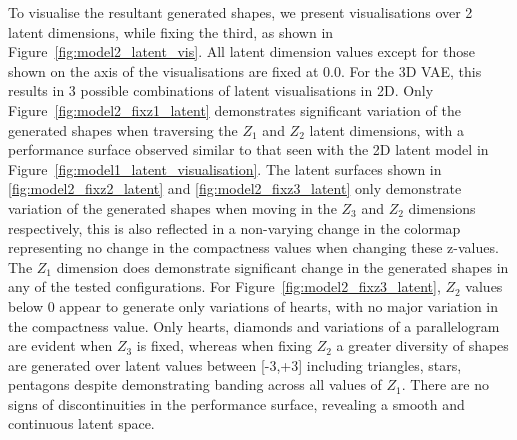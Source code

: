 \documentclass{article}
\begin{document}
To visualise the resultant generated shapes, we present visualisations over 2 latent dimensions, while fixing the third, as shown in Figure~\ref{fig:model2_latent_vis}. All latent dimension values except for those shown on the axis of the visualisations are fixed at $0.0$. For the 3D VAE, this results in 3 possible combinations of latent visualisations in 2D. Only Figure~\ref{fig:model2_fixz1_latent} demonstrates significant variation of the generated shapes when traversing the $Z_1$ and $Z_2$ latent dimensions, with a performance surface observed similar to that seen with the 2D latent model in Figure~\ref{fig:model1_latent_visualisation}. The latent surfaces shown in \ref{fig:model2_fixz2_latent} and \ref{fig:model2_fixz3_latent} only demonstrate variation of the generated shapes when moving in the $Z_3$ and $Z_2$ dimensions respectively, this is also reflected in a non-varying change in the colormap representing no change in the compactness values when changing these z-values. The $Z_1$ dimension does demonstrate significant change in the generated shapes in any of the tested configurations. For Figure~\ref{fig:model2_fixz3_latent}, $Z_2$ values below 0 appear to generate only variations of hearts, with no major variation in the compactness value. Only hearts, diamonds and variations of a parallelogram are evident when $Z_3$ is fixed, whereas when fixing $Z_2$ a greater diversity of shapes are generated over latent values between [-3,+3] including triangles, stars, pentagons despite demonstrating banding across all values of $Z_1$. There are no signs of discontinuities in the performance surface, revealing a smooth and continuous latent space.
\end{document}

